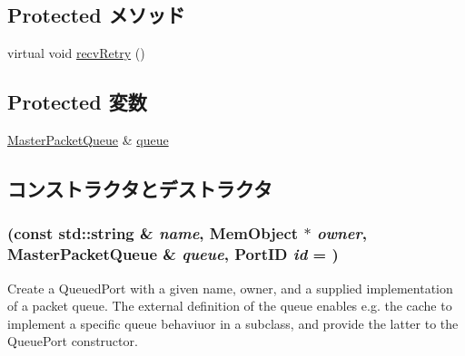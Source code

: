\subsection*{Protected メソッド}
\begin{DoxyCompactItemize}
\item 
virtual void \hyperlink{classQueuedMasterPort_a7ec461ad187b82b4b21e27c86e45cf9c}{recvRetry} ()
\end{DoxyCompactItemize}
\subsection*{Protected 変数}
\begin{DoxyCompactItemize}
\item 
\hyperlink{classMasterPacketQueue}{MasterPacketQueue} \& \hyperlink{classQueuedMasterPort_ae4e2ec83c21e5a331cecc31d84b2dbb7}{queue}
\end{DoxyCompactItemize}


\subsection{コンストラクタとデストラクタ}
\hypertarget{classQueuedMasterPort_afe8cac63edc9b33614a9c9c7d67b1103}{
\subsubsection[{QueuedMasterPort}]{ (const std::string \& {\em name}, \/  {\bf MemObject} $\ast$ {\em owner}, \/  {\bf MasterPacketQueue} \& {\em queue}, \/  {\bf PortID} {\em id} = {})}}
\label{classQueuedMasterPort_afe8cac63edc9b33614a9c9c7d67b1103}
Create a QueuedPort with a given name, owner, and a supplied implementation of a packet queue. The external definition of the queue enables e.g. the cache to implement a specific queue behaviuor in a subclass, and provide the latter to the QueuePort constructor. 



